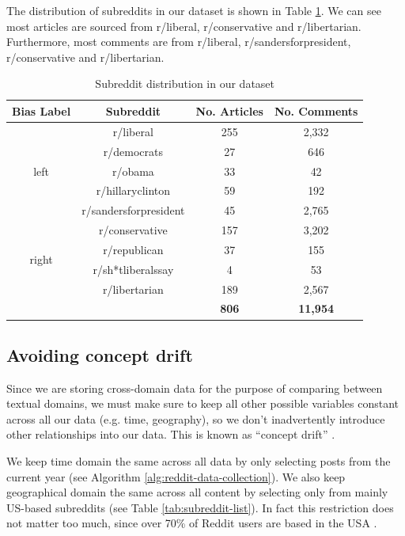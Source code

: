 The distribution of subreddits in our dataset is shown in Table \ref{tab:subreddit-distribution}. We can see most articles are sourced from r/liberal, r/conservative and r/libertarian. Furthermore, most comments are from r/liberal, r/sandersforpresident, r/conservative and r/libertarian.

\begin{table}[ht]
    \centering
    \begin{tabular}{|c|c|c|c|}
        \hline
        \textbf{Bias Label} & \textbf{Subreddit} & \textbf{No. Articles} & \textbf{No. Comments} \\
        \hline
        \multirow{5}{2em}{left} & r/liberal & 255 & 2,332 \\
        & r/democrats & 27 & 646 \\
        & r/obama & 33 & 42 \\
        & r/hillaryclinton & 59 & 192 \\
        & r/sandersforpresident & 45 & 2,765 \\
        \hline
        \multirow{4}{2em}{right} & r/conservative & 157 & 3,202 \\
        & r/republican & 37 & 155 \\
        & r/sh*tliberalssay & 4 & 53 \\
        & r/libertarian & 189 & 2,567 \\
        \hline
        \multicolumn{2}{c|}{} & \textbf{806} & \textbf{11,954} \\
        \cline{3-4}
    \end{tabular}
    \caption{Subreddit distribution in our dataset}
    \label{tab:subreddit-distribution}
\end{table}

\subsection{Avoiding concept drift}

Since we are storing cross-domain data for the purpose of comparing between textual domains, we must make sure to keep all other possible variables constant across all our data (e.g. time, geography), so we don't inadvertently introduce other relationships into our data. This is known as ``concept drift'' \cite{concept-drift}.

We keep time domain the same across all data by only selecting posts from the current year (see Algorithm \ref{alg:reddit-data-collection}). We also keep geographical domain the same across all content by selecting only from mainly US-based subreddits (see Table \ref{tab:subreddit-list}). In fact this restriction does not matter too much, since over 70\% of Reddit users are based in the USA \cite{sattelberg}.


